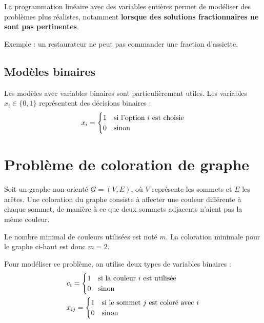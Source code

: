 \documentclass{report}
\begin{document}
\begin{multicols*}{2}
La programmation linéaire avec des variables entières permet de modéliser des
problèmes plus réalistes, notamment
\textbf{lorsque des solutions fractionnaires ne sont
pas pertinentes}.

Exemple : un restaurateur ne peut pas commander une fraction d'assiette.

\subsection{Modèles binaires}

Les modèles avec variables binaires sont particulièrement utiles. Les variables
\( x_i \in \{0, 1\} \) représentent des décisions binaires :
\[
x_i =
\begin{cases}
1 & \text{si l'option \( i \) est choisie} \\
0 & \text{sinon}
\end{cases}
\]

\section{Problème de coloration de graphe}

Soit un graphe non orienté \( G = (V, E) \), où \( V \) représente les sommets et 
\( E \) les arêtes. Une coloration du graphe consiste à affecter une couleur 
différente à chaque sommet, de manière à ce que deux sommets adjacents n'aient 
pas la même couleur.


Le nombre minimal de couleurs utilisées est noté \( m \). La coloration 
minimale pour le graphe ci-haut est donc $m = 2$.

Pour modéliser ce problème, on utilise deux types de variables binaires :
\begin{align*}
&c_i =
\begin{cases}
1 & \text{si la couleur \( i \) est utilisée} \\
0 & \text{sinon}
\end{cases}
\\
&x_{ij} =
\begin{cases}
1 & \text{si le sommet \( j \) est coloré avec \( i \)} \\
0 & \text{sinon}
\end{cases}
\end{align*}


\end{multicols*}
\end{document}
